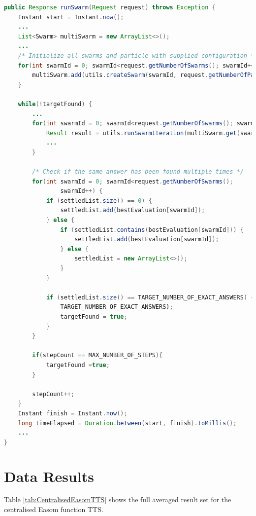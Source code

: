 \documentclass[oneside,12pt]{book}
\begin{document}
\begin{lstlisting}[basicstyle=\footnotesize, language=Java]
public Response runSwarm(Request request) throws Exception {
    Instant start = Instant.now();
    ...
    List<Swarm> multiSwarm = new ArrayList<>();
    ...
    /* Initialize all swarms and particle with supplied configuration */
    for(int swarmId = 0; swarmId<request.getNumberOfSwarms(); swarmId++) {
        multiSwarm.add(utils.createSwarm(swarmId, request.getNumberOfParticles(), request.getConfigVariables()));
    }

    while(!targetFound) {
        ...
        for(int swarmId = 0; swarmId<request.getNumberOfSwarms(); swarmId++) {
            Result result = utils.runSwarmIteration(multiSwarm.get(swarmId), stepCount);
            ...
        }
        
        /* Check if the same answer has been found multiple times */
        for(int swarmId = 0; swarmId<request.getNumberOfSwarms(); 
                swarmId++) {
            if (settledList.size() == 0) {
                settledList.add(bestEvaluation[swarmId]);
            } else {
                if (settledList.contains(bestEvaluation[swarmId])) {
                    settledList.add(bestEvaluation[swarmId]);
                } else {
                    settledList = new ArrayList<>();
                }
            }

            if (settledList.size() == TARGET_NUMBER_OF_EXACT_ANSWERS) {
                TARGET_NUMBER_OF_EXACT_ANSWERS);
                targetFound = true;
            }
        }

        if(stepCount == MAX_NUMBER_OF_STEPS){
            targetFound =true;
        }

        stepCount++;
    }
    Instant finish = Instant.now();
    long timeElapsed = Duration.between(start, finish).toMillis();
    ...
}
\end{lstlisting}
\label{listing:CentralisedServiceMethod}

\chapter{Data Results}

Table \ref{tab:CentralisedEasomTTS} shows the full averaged result set for the centralised Easom function TTS. 
\end{document}

